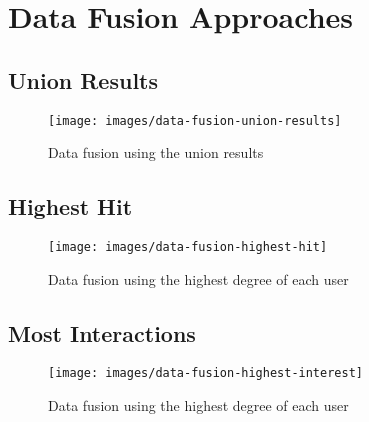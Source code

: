 \section{Data Fusion Approaches}

\subsection{Union Results}


\begin{figure}[!h]
	\centering
	\texttt{[image: images/data-fusion-union-results]}
	\caption{Data fusion using the union results}
	\label{fig:data-fusion-union-results}
\end{figure}

\subsection{Highest Hit}

\begin{figure}[!h]
	\centering
	\texttt{[image: images/data-fusion-highest-hit]}
	\caption{Data fusion using the highest degree of each user}
	\label{fig:data-fusion-highest-hit}
\end{figure}

\subsection{Most Interactions}

\begin{figure}[!h]
	\centering
	\texttt{[image: images/data-fusion-highest-interest]}
	\caption{Data fusion using the highest degree of each user}
	\label{fig:data-fusion-highest-ineterest}
\end{figure}
